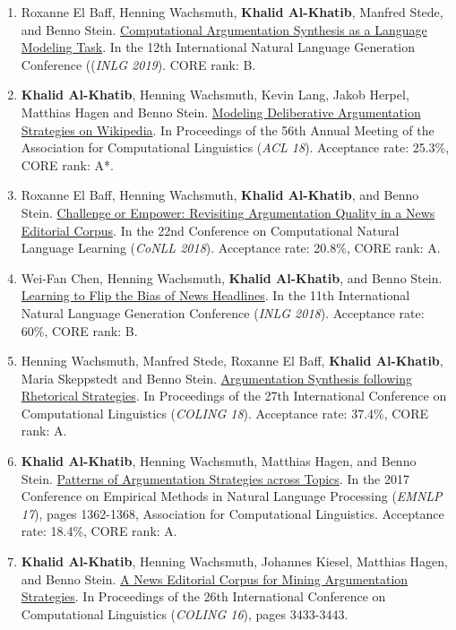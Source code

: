 \begin{enumerate}
{Acceptance rate: 20.6\%, CORE rank: A*.
}
\item {Roxanne El Baff, Henning Wachsmuth, \textbf{Khalid Al-Khatib}, Manfred Stede, and Benno Stein. \href{https://aclanthology.org/W19-8607/}{Computational Argumentation Synthesis as a Language Modeling Task}. In the 12th International Natural Language Generation Conference ((\textit{INLG 2019}).
CORE rank: B.
}
\item {\textbf{Khalid Al-Khatib}, Henning Wachsmuth, Kevin Lang, Jakob Herpel, Matthias Hagen and Benno Stein. \href{https://aclanthology.org/P18-1237/}{Modeling Deliberative Argumentation Strategies on Wikipedia}. In Proceedings of the 56th Annual Meeting of the Association for Computational Linguistics (\textit{ACL 18}). 
Acceptance rate: 25.3\%, CORE rank: A*. 
}
\item {Roxanne El Baff, Henning Wachsmuth, \textbf{Khalid Al-Khatib}, and Benno Stein. \href{https://aclanthology.org/K18-1044/}{Challenge or Empower: Revisiting Argumentation Quality in a News Editorial Corpus}. In the 22nd Conference on Computational Natural Language Learning (\textit{CoNLL 2018}). 
Acceptance rate: 20.8\%, CORE rank: A.
}
\item {Wei-Fan Chen, Henning Wachsmuth, \textbf{Khalid Al-Khatib}, and Benno Stein. \href{https://aclanthology.org/W18-6509/}{Learning to Flip the Bias of News Headlines}. In the 11th International Natural Language Generation Conference (\textit{INLG 2018}).
Acceptance rate: 60\%, CORE rank: B. 
}
\item {Henning Wachsmuth, Manfred Stede, Roxanne El Baff, \textbf{Khalid Al-Khatib}, Maria Skeppstedt and Benno Stein. \href{https://aclanthology.org/C18-1318/}{Argumentation Synthesis following Rhetorical Strategies}. In Proceedings of the 27th International Conference on Computational Linguistics (\textit{COLING 18}).
Acceptance rate: 37.4\%, CORE rank: A. 
}
\item {\textbf{Khalid Al-Khatib}, Henning Wachsmuth, Matthias Hagen, and Benno Stein. \href{https://aclanthology.org/D17-1141/}{Patterns of Argumentation Strategies across Topics}. In the 2017 Conference on Empirical Methods in Natural Language Processing (\textit{EMNLP 17}), pages 1362-1368, Association for Computational Linguistics.
Acceptance rate: 18.4\%, CORE rank: A. 
}
\item {\textbf{Khalid Al-Khatib}, Henning Wachsmuth, Johannes Kiesel, Matthias Hagen, and Benno Stein. \href{https://aclanthology.org/C16-1324/}{A News Editorial Corpus for Mining Argumentation Strategies}. In Proceedings of the 26th International Conference on Computational Linguistics (\textit{COLING 16}), pages 3433-3443.
}
\end{enumerate}

